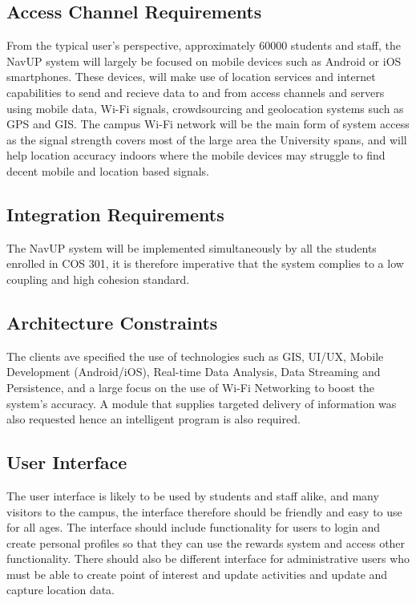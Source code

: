 \documentclass[11pt,a4paper]{article}
\begin{document}
			\subsection{Access Channel Requirements}
				From the typical user's perspective, approximately 60000 students and staff, the NavUP system will largely be focused on mobile devices such as Android or iOS smartphones.
				These devices, will make use of location services and internet capabilities to send and recieve data to and from access channels and servers using mobile data,
				Wi-Fi signals, crowdsourcing and geolocation systems such as GPS and GIS. The campus Wi-Fi network will be the main form of system access as the signal
				strength covers most of the large area the University spans, and will help location accuracy indoors where the mobile devices may struggle to find decent mobile
				and location based signals.

			
			
			\subsection{Integration Requirements}
				The NavUP system will be implemented simultaneously by all the students enrolled in COS 301, it is therefore imperative that the system complies to a low coupling and high cohesion standard.
			\subsection{Architecture Constraints}
				The clients ave specified the use of technologies such as GIS, UI/UX, Mobile Development (Android/iOS),  Real-time Data Analysis, Data Streaming and
				Persistence, and a large focus on the use of Wi-Fi Networking to boost the system's accuracy. A module that supplies targeted delivery of information was also requested hence an intelligent program is also required.
				
			\subsection{User Interface}
				The user interface is likely to be used by students and staff alike, and many visitors to the campus, the interface therefore should be friendly and easy to use for all ages. The interface should include functionality for users to login and create personal profiles
				so that they can use the rewards system and access other functionality. There should also be different interface for administrative users who must be able to create point of interest and update activities and update and capture location data.
\end{document}
